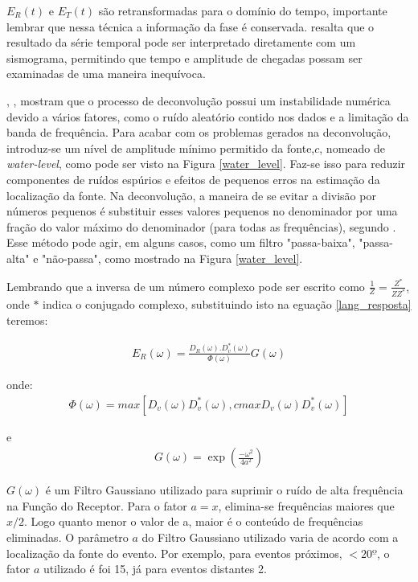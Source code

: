$E_{R}(t)$ e $E_{T}(t)$ são retransformadas para o domínio do tempo, importante lembrar que nessa técnica a informação da fase é conservada. \cite{langston_structure_1979} resalta que o resultado da série temporal pode ser interpretado diretamente com um sismograma, permitindo que tempo e amplitude de chegadas possam ser examinadas de uma maneira inequívoca.

\cite{clayton_source_1976}, \cite{langston_structure_1979}, \cite{ligorria_iterative_1999} mostram que o processo de deconvolução possui um instabilidade numérica devido a vários fatores, como o ruído aleatório contido nos dados e a limitação da banda de frequência. Para acabar com os problemas gerados na deconvolução, \cite{clayton_source_1976} introduz-se um nível de amplitude mínimo permitido da fonte,$c$, nomeado de \textit{water-level}, como pode ser visto na Figura \ref{water_level}. Faz-se isso para reduzir componentes de ruídos espúrios e efeitos de pequenos erros na estimação da localização da fonte. Na deconvolução, a maneira de se evitar a divisão por números pequenos é substituir esses valores pequenos no denominador por uma fração do valor máximo do denominador (para todas as frequências), segundo \cite{Ammon_waterlevel_1997}. Esse método pode agir, em alguns casos, como um filtro "passa-baixa", "passa-alta" e "não-passa", como mostrado na Figura \ref{water_level}. 

Lembrando que a inversa de um número complexo pode ser escrito como $\frac{1}{Z} = \frac{Z^{*}}{ZZ^{*}}$, onde $*$ indica o conjugado complexo, substituindo isto na eguação \ref{lang_resposta} teremos:

\begin{eqnarray}
E_{R}(\omega) =  \frac{D_{R}(\omega).D^{*}_{v}(\omega)}{\Phi(\omega)}G(\omega)
\end{eqnarray}

onde:
\begin{eqnarray} \nonumber
\Phi(\omega) = max[D_{v}(\omega)D^{*}_{v}(\omega),cmax{D_{v}(\omega)D^{*}_{v}(\omega)}] 
\end{eqnarray}

e
\begin{eqnarray} \nonumber
G(\omega) = \exp(\frac{-\omega ^{2}}{4a^{2}})
\end{eqnarray}

$G(\omega)$ é um Filtro Gaussiano utilizado para suprimir o ruído de alta frequência na Função do Receptor. Para o fator $a = x$, elimina-se frequências maiores que $x/2$. Logo quanto menor o valor de a, maior é o conteúdo de frequências eliminadas. O parâmetro $a$ do Filtro Gaussiano utilizado varia de acordo com a localização da fonte do evento. Por exemplo, para eventos próximos, $<20º$, o fator $a$ utilizado é foi 15, já para eventos distantes 2.

